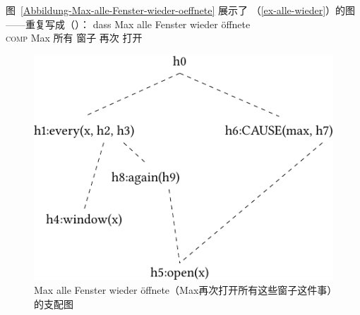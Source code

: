 图~\vref{Abbildung-Max-alle-Fenster-wieder-oeffnete} 展示了 （\ref{ex-alle-wieder}）的图——重复写成（）：
\ea
\label{ex-alle-wieder-zwei}
\gll dass Max alle Fenster wieder öffnete\\
	 \textsc{comp} Max 所有 窗子 再次 打开\\
\z
\begin{figure}
\centering
\includegraphics{Figures/mrs-max-alle-fenster-wieder-oeffnete-cropped.pdf}
\caption{Max alle Fenster wieder öffnete（Max再次打开所有这些窗子这件事）的支配图\label{Abbildung-Max-alle-Fenster-wieder-oeffnete}}
\end{figure}%

